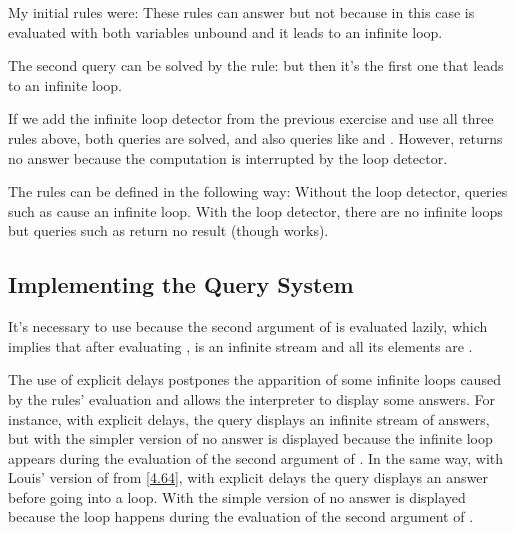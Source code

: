 \begin{exe}[4.68]
    My initial rules were:
    These rules can answer  but not
     because in this case
     is evaluated with both variables 
    unbound and it leads to an infinite loop.

    The second query can be solved by the rule:
    but then it’s the first one that leads to an infinite loop.

    If we add the infinite loop detector from the previous exercise and use all 
    three rules above, both queries are solved, and also queries like
     and
    . However,
     returns no answer because the 
    computation is interrupted by the loop detector.
\end{exe}

\begin{exe}[4.69]
    The rules can be defined in the following way:
    Without the loop detector, queries such as  cause an 
    infinite loop. With the loop detector, there are no infinite loops but 
    queries such as  return no result 
    (though  works).
\end{exe}

\subsection{Implementing the Query System}

\begin{exe}[4.70]
    It’s necessary to use  because the second argument of 
     is evaluated lazily, which implies that after evaluating
    , 
     is an infinite stream and all its elements are 
    .
\end{exe}

\begin{exe}[4.71]
    The use of explicit delays postpones the apparition of some infinite loops 
    caused by the rules’ evaluation and allows the interpreter to display some 
    answers. For instance, with explicit delays, the query
     displays an infinite stream of answers, but 
    with the simpler version of  no answer is displayed 
    because the infinite loop appears during the evaluation of the second 
    argument of . In the same way, with Louis’ version of 
     from \autoref{4.64}, with explicit delays the query
     displays an answer before going 
    into a loop. With the simple version of  no answer is 
    displayed because the loop happens during the evaluation of the second 
    argument of .
\end{exe}

